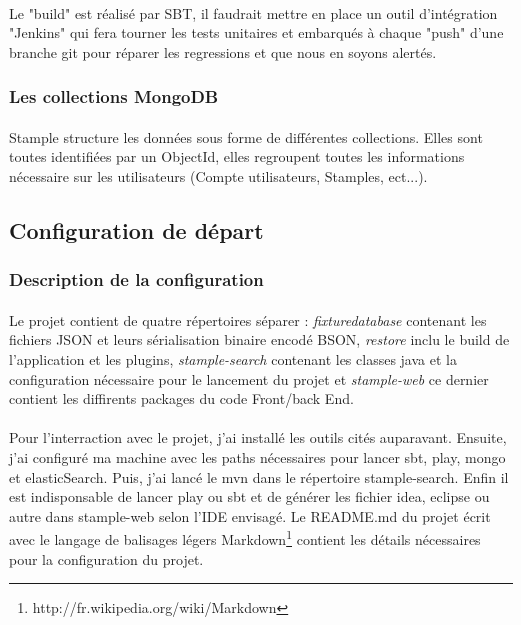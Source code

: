 \paragraph{}
Le "build" est réalisé par SBT, il faudrait mettre en place un outil d'intégration "Jenkins" qui fera tourner les tests unitaires et embarqués à chaque "push" d'une branche git pour réparer les regressions et que nous en soyons alertés.
\subsubsection{Les collections MongoDB}
\paragraph{}
Stample structure les données sous forme de différentes collections.
Elles sont toutes identifiées par un ObjectId, elles regroupent toutes les informations nécessaire sur les utilisateurs (Compte utilisateurs, Stamples, ect...).
\subsection{Configuration de départ}
\subsubsection{Description de la configuration}
\paragraph{}
Le projet contient de quatre répertoires séparer : \textit{fixturedatabase} contenant les fichiers JSON et leurs sérialisation binaire encodé BSON, \textit{restore} inclu le build de l'application et les plugins, \textit{stample-search} contenant les classes java et la configuration nécessaire pour le lancement du projet et \textit{stample-web} ce dernier contient les diffirents packages du code Front/back End.
\paragraph{}
Pour l'interraction avec le projet, j'ai installé les outils cités auparavant. Ensuite, j'ai configuré ma machine avec les paths nécessaires pour lancer sbt, play, mongo et elasticSearch. Puis, j'ai lancé le mvn dans le répertoire stample-search. Enfin il est indisponsable de lancer play ou sbt et de générer les fichier idea, eclipse ou autre dans stample-web selon l'IDE envisagé.    
Le README.md du projet écrit avec le langage de balisages légers Markdown\footnote{http://fr.wikipedia.org/wiki/Markdown} contient les détails nécessaires pour la configuration du projet.
